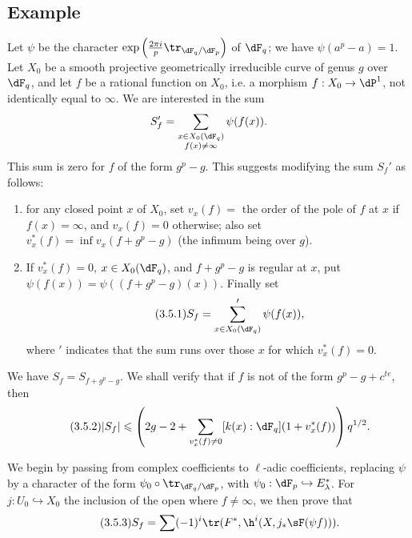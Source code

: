 \subsection{Example}\label{VI:3-5}

Let $\psi$ be the character 
$\exp\left(\frac{2\pi i}{p} \tr_{\dF_q/\dF_p}\right)$ of $\dF_q$; we have 
$\psi(a^p-a)=1$. Let $X_0$ be a smooth projective geometrically 
irreducible curve of genus $g$ over $\dF_q$, and let $f$ be a rational function on 
$X_0$, i.e. a morphism $f:X_0 \to \dP^1$, not identically equal to 
$\infty$. We are interested in the sum 
\[
  S_f' = \sum_{\substack{x\in X_0(\dF_q) \\ f(x)\ne \infty}} \psi(f(x)) 
  \text{.}
\]
This sum is zero for $f$ of the form $g^p-g$. This suggests modifying 
the sum $S_f'$ as follows: 
\begin{enumerate}[\indent a)]
  \item for any closed point $x$ of $X_0$, set $v_x(f) = $ the order of the 
    pole of $f$ at $x$ if $f(x)=\infty$, and $v_x(f)=0$ otherwise; also set 
    $v_x^\ast(f) = \inf v_x(f+g^p-g)$ (the infimum being over $g$). 
  \item If $v_x^\ast(f)=0$, $x\in X_0(\dF_q)$, and $f+g^p-g$ is 
    regular at $x$, put $\psi(f(x)) = \psi((f+g^p-g)(x))$. Finally set 
\begin{equation*}\tag{3.5.1}\label{VI:eq:3-5-1}
      S_f = \sum'_{x\in X_0(\dF_q)} \psi(f(x)) \text{,}
    \end{equation*}
    where $\prime$ indicates that the sum runs over those $x$ for which 
    $v_x^\ast(f)=0$. 
\end{enumerate}

We have $S_f=S_{f+g^p-g}$. We shall verify that if $f$ is not of the 
form $g^p-g+c^{t e}$, then 
\begin{equation*}\tag{3.5.2}\label{VI:eq:3-5-2}
  |S_f|\leqslant \left(2 g-2+\sum_{v_x^\ast(f)\ne 0} [k(x):\dF_q] (1+v_x^\ast(f))\right) q^{1/2} \text{.}
\end{equation*}

We begin by passing from complex coefficients to $\ell$-adic coefficients, replacing $\psi$ by 
a character of the form $\psi_0\circ \tr_{\dF_q/\dF_p}$, with 
$\psi_0:\dF_p\hookrightarrow E_\lambda^\ast$. For $j:U_0\hookrightarrow X_0$ 
the inclusion of the open where $f\ne\infty$, we then prove that 
\begin{equation*}\tag{3.5.3}\label{VI:eq:3-5-3}
  S_f = \sum (-1)^i \tr(F^\ast,\h^i(X,j_\ast \sF(\psi f))) \text{.} 
\end{equation*}

